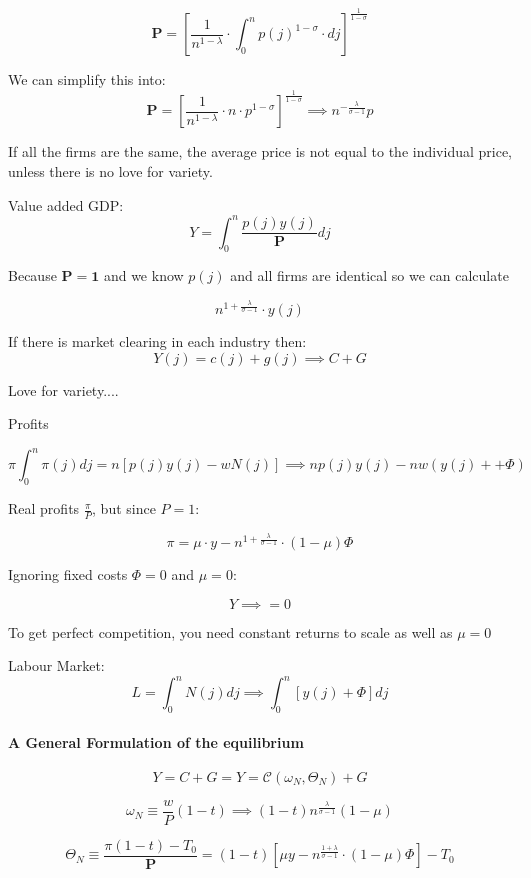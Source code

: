 $$
\mathbf{P} = \left[  \frac{1}{n^{1-\lambda}} \cdot \int_0^n p(j)^{1-\sigma} \cdot dj \right]^\frac{1}{1 - \sigma}
$$

We can simplify this into: 
$$
\mathbf{P} = \left[  \frac{1}{n^{1-\lambda}} \cdot n\cdot p^{1-\sigma}  \right]^\frac{1}{1 - \sigma} \implies n^{- \frac{\lambda}{\sigma - 1} }p
$$

If all the firms are the same, the average price is not equal to the individual price, unless there is no love for variety. 

Value added GDP:
$$
Y = \int_{0}^{n} \frac{p(j) y(j)}{\mathbf{P}}dj
$$

Because $\mathbf{P = 1}$ and we know $p(j)$ and all firms are identical so we can calculate 

$$
n^{1 + \frac{\lambda}{\sigma - 1}} \cdot y(j)
$$

If there is market clearing in each industry then:
$$
Y(j) = c(j) + g(j) \implies C + G
$$

Love for variety....



Profits



$$
\pi \int _ { 0 } ^ { n } \pi ( j ) d j = n \left[p(j) y(j) - wN(j) \right]
\implies
np(j)y(j) - nw\left( y(j) + + \Phi \right)
$$

Real profits $\tfrac{\pi}{P}$, but since $P = 1$:

$$
\pi = \mu \cdot y - n^{1 + \frac{\lambda}{\sigma - 1}} \cdot ( 1 - \mu) \Phi
$$

Ignoring fixed costs $\Phi = 0$ and $\mu = 0$:

$$
Y \implies = 0
$$

To get perfect competition, you need constant returns to scale as well as $\mu = 0$



Labour Market:
$$
L = \int_0^n N(j) dj \implies \int_0^n \left[y(j) + \Phi \right]dj
$$

\paragraph{A General Formulation of the equilibrium}
$$
Y = C + G = Y = \mathcal{C} \left(\omega_N, \Theta_N \right) + G
$$

$$
\omega_N \equiv \frac{w}{P}(1-t) \implies (1-t)n^{\frac{\lambda}{\sigma - 1}} (1-\mu)
$$

$$
\Theta_N \equiv \frac{\pi(1-t) - T_0}{\mathbf{P}} = (1-t)\left[ \mu y - n^{\frac{1 + \lambda}{\sigma - 1}} \cdot (1 - \mu) \Phi \right] - T_0
$$


